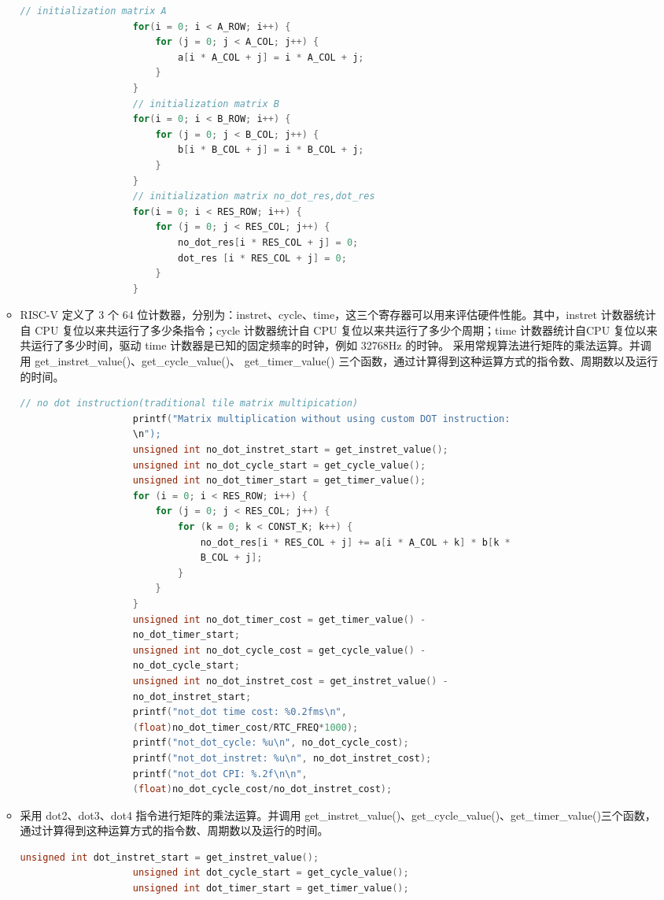 \documentclass[a4paper, 14pt, oneside]{book} %
\numberwithin{equation}{subsection}
\begin{document}
\begin{enumerate}
\begin{itemize}
				\begin{lstlisting}[language={C++}]
					// initialization matrix A
					for(i = 0; i < A_ROW; i++) {
						for (j = 0; j < A_COL; j++) {
							a[i * A_COL + j] = i * A_COL + j;
						}
					}
					// initialization matrix B
					for(i = 0; i < B_ROW; i++) {
						for (j = 0; j < B_COL; j++) {
							b[i * B_COL + j] = i * B_COL + j;
						}
					}
					// initialization matrix no_dot_res,dot_res
					for(i = 0; i < RES_ROW; i++) {
						for (j = 0; j < RES_COL; j++) {
							no_dot_res[i * RES_COL + j] = 0;
							dot_res [i * RES_COL + j] = 0;
						}
					}		
				\end{lstlisting}
				\item RISC-V 定义了 3 个 64 位计数器，分别为：instret、cycle、time，这三个寄存器可以用来评估硬件性能。其中，instret 计数器统计自 CPU 复位以来共运行了多少条指令；cycle 计数器统计自 CPU 复位以来共运行了多少个周期；time 计数器统计自CPU 复位以来共运行了多少时间，驱动 time 计数器是已知的固定频率的时钟，例如 32768Hz 的时钟。
				采用常规算法进行矩阵的乘法运算。并调用 get\_instret\_value()、get\_cycle\_value()、
				get\_timer\_value() 三个函数，通过计算得到这种运算方式的指令数、周期数以及运行的时间。
				\begin{lstlisting}[language={C++}]
					// no dot instruction(traditional tile matrix multipication)
					printf("Matrix multiplication without using custom DOT instruction:
					\n");
					unsigned int no_dot_instret_start = get_instret_value();
					unsigned int no_dot_cycle_start = get_cycle_value();
					unsigned int no_dot_timer_start = get_timer_value();
					for (i = 0; i < RES_ROW; i++) {
						for (j = 0; j < RES_COL; j++) {
							for (k = 0; k < CONST_K; k++) {
								no_dot_res[i * RES_COL + j] += a[i * A_COL + k] * b[k *
								B_COL + j];
							}
						}
					}
					unsigned int no_dot_timer_cost = get_timer_value() -
					no_dot_timer_start;
					unsigned int no_dot_cycle_cost = get_cycle_value() -
					no_dot_cycle_start;
					unsigned int no_dot_instret_cost = get_instret_value() -
					no_dot_instret_start;
					printf("not_dot time cost: %0.2fms\n",
					(float)no_dot_timer_cost/RTC_FREQ*1000);
					printf("not_dot_cycle: %u\n", no_dot_cycle_cost);
					printf("not_dot_instret: %u\n", no_dot_instret_cost);
					printf("not_dot CPI: %.2f\n\n",
					(float)no_dot_cycle_cost/no_dot_instret_cost);	
				\end{lstlisting}
				\item 采用 dot2、dot3、dot4 指令进行矩阵的乘法运算。并调用 get\_instret\_value()、get\_cycle\_value()、get\_timer\_value()三个函数，通过计算得到这种运算方式的指令数、周期数以及运行的时间。
				\begin{lstlisting}[language={C++}]
					unsigned int dot_instret_start = get_instret_value();
					unsigned int dot_cycle_start = get_cycle_value();
					unsigned int dot_timer_start = get_timer_value(); 
					

\end{lstlisting}
\end{itemize}
\end{enumerate}
\end{document}
